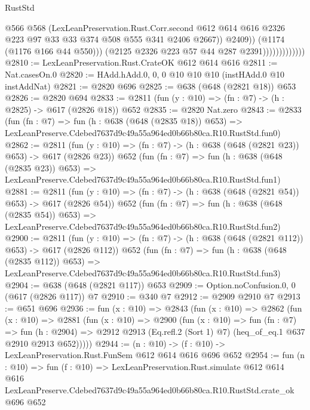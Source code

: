\begin{lexlean}{RustStd}
\begin{coremodule}
                                    @566
                                    @568
                                    (LexLeanPreservation.Rust.Corr.second
                                      @612
                                      @614
                                      @616
                                      @2326
                                      @223
                                      @97
                                      @33
                                      @33
                                      @374
                                      @508
                                      @555
                                      @341
                                      @2406
                                      @2667))
                                  @2409))
                              (@1174 (@1176 @166 @44 @550)))
                            (@2125 @2326 @223 @57 @44 @287 @2391)))))))))))))
@2810 := LexLeanPreservation.Rust.CrateOK @612 @614 @616
@2811 := Nat.casesOn.{0}
@2820 := HAdd.hAdd.{0, 0, 0} @10 @10 @10 (instHAdd.{0} @10 instAddNat)
@2821 := @2820 @696
@2825 := @638 (@648 (@2821 @18)) @653
@2826 := @2820 @694
@2833 := @2811 (fun (y : @10) => (fn : @7) -> (h : @2825) -> @617 (@2826 @18)) @652
@2835 := @2820 Nat.zero
@2843 := @2833
    (fun (fn : @7) =>
    fun (h : @638 (@648 (@2835 @18)) @653) =>
    LexLeanPreserve.Cdebed7637d9c49a55a964ed0b66b80ca.R10.RustStd.fun0)
@2862 := @2811
    (fun (y : @10) => (fn : @7) -> (h : @638 (@648 (@2821 @23)) @653) -> @617 (@2826 @23))
    @652
    (fun (fn : @7) =>
    fun (h : @638 (@648 (@2835 @23)) @653) =>
    LexLeanPreserve.Cdebed7637d9c49a55a964ed0b66b80ca.R10.RustStd.fun1)
@2881 := @2811
    (fun (y : @10) => (fn : @7) -> (h : @638 (@648 (@2821 @54)) @653) -> @617 (@2826 @54))
    @652
    (fun (fn : @7) =>
    fun (h : @638 (@648 (@2835 @54)) @653) =>
    LexLeanPreserve.Cdebed7637d9c49a55a964ed0b66b80ca.R10.RustStd.fun2)
@2900 := @2811
    (fun (y : @10) => (fn : @7) -> (h : @638 (@648 (@2821 @112)) @653) -> @617 (@2826 @112))
    @652
    (fun (fn : @7) =>
    fun (h : @638 (@648 (@2835 @112)) @653) =>
    LexLeanPreserve.Cdebed7637d9c49a55a964ed0b66b80ca.R10.RustStd.fun3)
@2904 := @638 (@648 (@2821 @117)) @653
@2909 := Option.noConfusion.{0, 0} (@617 (@2826 @117)) @7
@2910 := @340 @7
@2912 := @2909 @2910 @7
@2913 := @651 @696
@2936 := fun (x : @10) =>
  @2843
    (fun (x : @10) =>
    @2862
      (fun (x : @10) =>
      @2881
        (fun (x : @10) =>
        @2900
          (fun (x : @10) =>
          fun (fn : @7) =>
          fun (h : @2904) =>
          @2912 @2913 (Eq.refl.{2} (Sort 1) @7) (heq_of_eq.{1} @637 @2910 @2913 @652)))))
@2944 := (n : @10) -> (f : @10) -> LexLeanPreservation.Rust.FunSem @612 @614 @616 @696 @652
@2954 := fun (n : @10) =>
  fun (f : @10) =>
  LexLeanPreservation.Rust.simulate
    @612
    @614
    @616
    LexLeanPreserve.Cdebed7637d9c49a55a964ed0b66b80ca.R10.RustStd.crate_ok
    @696
    @652
\end{coremodule}
\end{lexlean}
